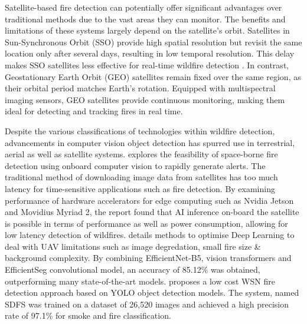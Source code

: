 \documentclass[lettersize,journal]{IEEEtran}
\begin{document}
Satellite-based fire detection can potentially offer significant
advantages over traditional methods due to the vast areas they can
monitor. The benefits and limitations of these systems largely depend on
the satellite's orbit. Satellites in Sun-Synchronous Orbit (SSO) provide
high spatial resolution but revisit the same location only after several
days, resulting in low temporal resolution. This delay makes SSO
satellites less effective for real-time wildfire detection
\cite{satellite}. In contrast, Geostationary Earth Orbit (GEO) satellites
remain fixed over the same region, as their orbital period matches
Earth's rotation. Equipped with multispectral imaging sensors, GEO
satellites provide continuous monitoring, making them ideal for
detecting and tracking fires in real time.

\IEEEpubidadjcol
Despite the various classifications of technologies within wildfire
detection, advancements in computer vision object detection has spurred
use in terrestrial, aerial as well as satellite systems. \cite{satellite}
explores the feasibility of space-borne fire detection using onboard
computer vision to rapidly generate alerts. The traditional method of
downloading image data from satellites has too much latency for
time-sensitive applications such as fire detection. By examining
performance of hardware accelerators for edge computing such as Nvidia
Jetson and Movidius Myriad 2, the report found that AI inference
on-board the satellite is possible in terms of performance as well as
power consumption, allowing for low latency detection of wildfires.
\cite{uavai} details methods to optimise Deep Learning to deal with UAV
limitations such as image degredation, small fire size \& background
complexity. By combining EfficientNet-B5, vision transformers and
EfficientSeg convolutional model, an accuracy of 85.12\% was obtained,
outperforming many state-of-the-art models. \cite{wsnyolo} proposes a low
cost WSN fire detection approach based on YOLO object detection models.
The system, named SDFS was trained on a dataset of 26,520 images and
achieved a high precision rate of 97.1\% for smoke and fire
classification.
\end{document}

